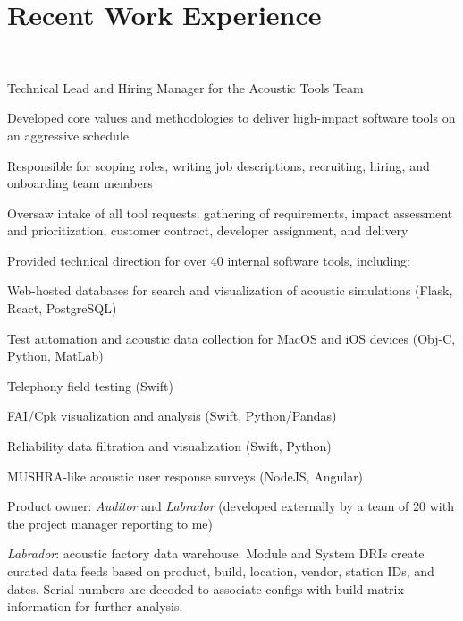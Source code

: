 \documentclass[]{jhearn-resume}
\begin{document}
\begin{minipage}[t]{0.64\textwidth}
\section{Recent Work Experience}
 \\
\vspace{\topsep} %
\begin{tightemize}
\item Technical Lead and Hiring Manager for the Acoustic Tools Team
\item Developed core values and methodologies to deliver high-impact software tools on an aggressive schedule
\item Responsible for scoping roles, writing job descriptions, recruiting, hiring, and onboarding team members
\item Oversaw intake of all tool requests: gathering of requirements, impact assessment and prioritization, customer contract, developer assignment, and delivery   
\item Provided technical direction for over 40 internal software tools, including:
	\begin{tightemize}
	\vspace{\topsep}
	\item Web-hosted databases for search and visualization of acoustic simulations (Flask, React, PostgreSQL)
	\item Test automation and acoustic data collection for MacOS and iOS devices (Obj-C, Python, MatLab)
	\item Telephony field testing (Swift)
	\item FAI/Cpk visualization and analysis (Swift, Python/Pandas)
	\item Reliability data filtration and visualization (Swift, Python)
	\item MUSHRA-like acoustic user response surveys (NodeJS, Angular)
	\end{tightemize}
	\vspace{\topsep}
\item Product owner: \emph{Auditor} and \emph{Labrador} (developed externally by a team of 20 with the project manager reporting to me)
	\begin{tightemize}
	\vspace{\topsep}
	\item \emph{Labrador}: acoustic factory data warehouse. Module and System DRIs create curated data feeds based on product, build, location, vendor, station IDs, and dates. Serial numbers are decoded to associate configs with build matrix information for further analysis.

\end{tightemize}
\end{tightemize}
\end{minipage}
\end{document}
